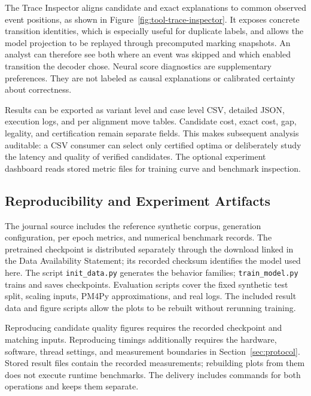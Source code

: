 The Trace Inspector aligns candidate and exact explanations to common observed event positions, as shown in Figure~\ref{fig:tool-trace-inspector}. It exposes concrete transition identities, which is especially useful for duplicate labels, and allows the model projection to be replayed through precomputed marking snapshots. An analyst can therefore see both where an event was skipped and which enabled transition the decoder chose. Neural score diagnostics are supplementary preferences. They are not labeled as causal explanations or calibrated certainty about correctness.

Results can be exported as variant level and case level CSV, detailed JSON, execution logs, and per alignment move tables. Candidate cost, exact cost, gap, legality, and certification remain separate fields. This makes subsequent analysis auditable: a CSV consumer can select only certified optima or deliberately study the latency and quality of verified candidates. The optional experiment dashboard reads stored metric files for training curve and benchmark inspection.



\subsection{Reproducibility and Experiment Artifacts}

The journal source includes the reference synthetic corpus, generation configuration, per epoch metrics, and numerical benchmark records. The pretrained checkpoint is distributed separately through the download linked in the Data Availability Statement; its recorded checksum identifies the model used here. The script \texttt{init\_data.py} generates the behavior families; \texttt{train\_model.py} trains and saves checkpoints. Evaluation scripts cover the fixed synthetic test split, scaling inputs, PM4Py approximations, and real logs. The included result data and figure scripts allow the plots to be rebuilt without rerunning training.

Reproducing candidate quality figures requires the recorded checkpoint and matching inputs. Reproducing timings additionally requires the hardware, software, thread settings, and measurement boundaries in Section~\ref{sec:protocol}. Stored result files contain the recorded measurements; rebuilding plots from them does not execute runtime benchmarks. The delivery includes commands for both operations and keeps them separate.

